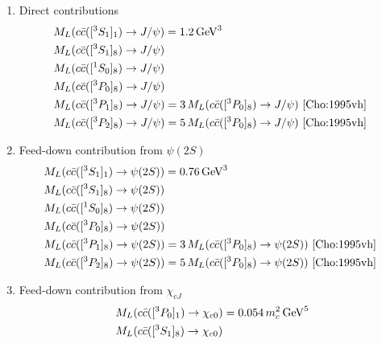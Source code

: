 \documentclass[12pt,a4paper,final]{iopart}
\newcommand{\barc}{{\bar{c}}}
\begin{document}
\begin{enumerate}
\item{Direct contributions
\begin{equation}
\begin{split}
&M_{L}(c\barc([^3S_1]_{1})\rightarrow J/\psi) = 1.2\,{\rm GeV}^{3}\\
&M_{L}(c\barc([^3S_1]_{8})\rightarrow J/\psi) \\
&M_{L}(c\barc([^1S_0]_{8})\rightarrow J/\psi) \\
&M_{L}(c\barc([^3P_0]_{8})\rightarrow J/\psi) \\
&M_{L}(c\barc([^3P_1]_{8})\rightarrow J/\psi)= 3\,M_{L}(c\barc([^3P_0]_{8})\rightarrow J/\psi)~\cite{Cho:1995vh}\\ 
&M_{L}(c\barc([^3P_2]_{8})\rightarrow J/\psi)= 5\,M_{L}(c\barc([^3P_0]_{8})\rightarrow J/\psi)~\cite{Cho:1995vh}
~\label{eq:Mpsi1}
\end{split}
\end{equation}
    }
\item{Feed-down contribution from $\psi(2S)$
\begin{equation}
\begin{split}
&M_{L}(c\barc([^3S_1]_{1})\rightarrow \psi(2S)) = 0.76\,{\rm GeV}^{3}\\
&M_{L}(c\barc([^3S_1]_{8})\rightarrow \psi(2S)) \\
&M_{L}(c\barc([^1S_0]_{8})\rightarrow \psi(2S)) \\
&M_{L}(c\barc([^3P_0]_{8})\rightarrow \psi(2S))\\
&M_{L}(c\barc([^3P_1]_{8})\rightarrow \psi(2S))=3\,M_{L}(c\barc([^3P_0]_{8})\rightarrow \psi(2S))~\cite{Cho:1995vh}\\
&M_{L}(c\barc([^3P_2]_{8})\rightarrow \psi(2S))=5\,M_{L}(c\barc([^3P_0]_{8})\rightarrow \psi(2S))~\cite{Cho:1995vh}
~\label{eq:Mpsi2}
\end{split}
\end{equation}
  }
\item{Feed-down contribution from $\chi_{cJ}$
\begin{equation}
\begin{split}
&M_{L}(c\barc([^3P_0]_{1})\rightarrow \chi_{c0}) = 0.054\,m_{c}^{2}\,{\rm GeV}^{5}\\ 
&M_{L}(c\barc([^3S_1]_{8})\rightarrow \chi_{c0})
~\label{eq:Mchi}
\end{split}
\end{equation}
    }
\end{enumerate}
\end{document}
